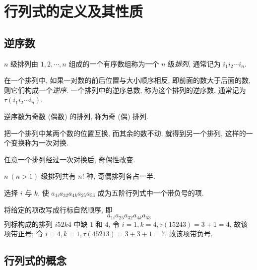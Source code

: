 \section{行列式的定义及其性质}

\subsection{逆序数}

\begin{definition}[排列]
    $n $ 级排列由 $ 1,2, \cdots, n $ 组成的一个有序数组称为一个 $ n $ 级\textit{排列}, 通常记为 $ i_{1} i_{2} \cdots i_{n} $.
\end{definition}
\begin{definition}[逆序数]
    在一个排列中, 如果一对数的前后位置与大小顺序相反, 即前面的数大于后面的数, 则它们构成一个\textit{逆序}.
    一个排列中的逆序总数, 称为这个排列的逆序数, 通常记为 $ \tau\left(i_{1} i_{2} \cdots i_{n}\right) $.
\end{definition}
\begin{definition}[奇 (偶) 排列]
    逆序数为奇数 (偶数) 的排列, 称为奇 (偶) 排列.
\end{definition}
\begin{definition}[对换]
    把一个排列中某两个数的位置互换, 而其余的数不动, 就得到另一个排列, 这样的一个变换称为一次对换.
\end{definition}
\begin{theorem}
    任意一个排列经过一次对换后, 奇偶性改变.
\end{theorem}
\begin{theorem}
    $ n ~(n>1)$ 级排列共有 $ n! $ 种, 奇偶排列各占一半.
\end{theorem}

\begin{example}
    选择 $i$ 与 $k$, 使 $a_{1i}a_{32}a_{4k}a_{25}a_{53}$ 成为五阶行列式中一个带负号的项.
\end{example}
\begin{solution}
    将给定的项改写成行标自然顺序, 即 $$a_{1i}a_{25}a_{32}a_{4k}a_{53}$$
    列标构成的排列 $i52k4$ 中缺 $1$ 和 $4$, 令 $i=1,k=4,\tau(15243)=3+1=4$, 故该项带正号;
    令 $i=4,k=1,\tau(45213)=3+3+1=7$, 故该项带负号.
\end{solution}

\subsection{行列式的概念}

